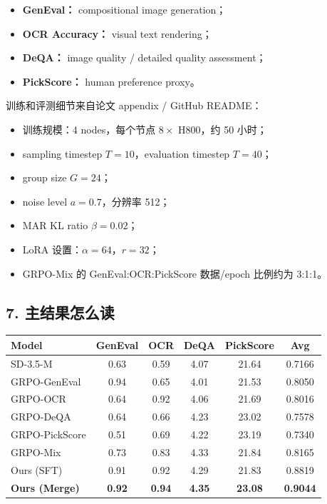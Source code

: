 \begin{itemize}[leftmargin=1.5em]
  \item \textbf{GenEval：} compositional image generation；
  \item \textbf{OCR Accuracy：} visual text rendering；
  \item \textbf{DeQA：} image quality / detailed quality assessment；
  \item \textbf{PickScore：} human preference proxy。
\end{itemize}

训练和评测细节来自论文 appendix / GitHub README：

\begin{itemize}[leftmargin=1.5em]
  \item 训练规模：4 nodes，每个节点 $8\times$ H800，约 50 小时；
  \item sampling timestep $T=10$，evaluation timestep $T=40$；
  \item group size $G=24$；
  \item noise level $a=0.7$，分辨率 512；
  \item MAR KL ratio $\beta=0.02$；
  \item LoRA 设置：$\alpha=64$，$r=32$；
  \item GRPO-Mix 的 GenEval:OCR:PickScore 数据/epoch 比例约为 3:1:1。
\end{itemize}

\subsection{7. 主结果怎么读}

\begin{center}
\small
\setlength{\tabcolsep}{4pt}
\begin{tabular}{lccccc}
\toprule
\textbf{Model} & \textbf{GenEval} & \textbf{OCR} & \textbf{DeQA} & \textbf{PickScore} & \textbf{Avg} \\
\midrule
SD-3.5-M & 0.63 & 0.59 & 4.07 & 21.64 & 0.7166 \\
GRPO-GenEval & 0.94 & 0.65 & 4.01 & 21.53 & 0.8050 \\
GRPO-OCR & 0.64 & 0.92 & 4.06 & 21.69 & 0.8016 \\
GRPO-DeQA & 0.64 & 0.66 & 4.23 & 23.02 & 0.7578 \\
GRPO-PickScore & 0.51 & 0.69 & 4.22 & 23.19 & 0.7340 \\
GRPO-Mix & 0.73 & 0.83 & 4.33 & 21.84 & 0.8165 \\
Ours (SFT) & 0.91 & 0.92 & 4.29 & 21.83 & 0.8819 \\
\textbf{Ours (Merge)} & \textbf{0.92} & \textbf{0.94} & \textbf{4.35} & \textbf{23.08} & \textbf{0.9044} \\
\bottomrule
\end{tabular}
\end{center}


